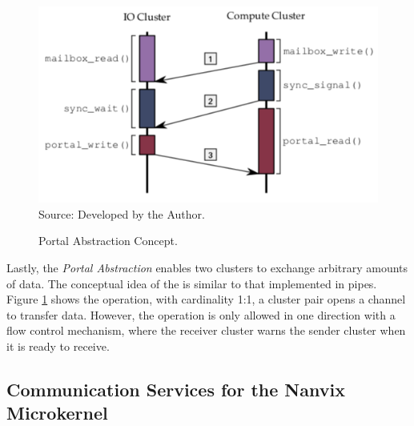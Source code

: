 			\label{sec.portal-abs}

				\begin{figure}[t]
					\centering
					\caption{Portal Abstraction Concept.}
					\includegraphics[width=.7\textwidth]{images/conceptual-sync.png}
					Source: Developed by the Author.
					\label{fig.conpt_portal}
				\end{figure}

				Lastly, the \textit{Portal Abstraction} enables two clusters to exchange arbitrary
				amounts of data.
				The conceptual idea of the \portal is similar to that implemented in \posix pipes.
				Figure \ref{fig.conpt_portal} shows the \portal operation, with cardinality
				1:1, a cluster pair opens a channel to transfer data.
				However, the operation is only allowed in one direction with a flow control mechanism,
				where the receiver cluster warns the sender cluster when it is ready to receive.
		
	\subsection{Communication Services for the Nanvix Microkernel}
	
